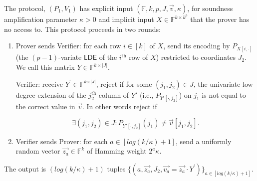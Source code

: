 \documentclass[11pt]{article}
\makeatletter
\newcommand{\LDE}{\mathsf{LDE}}
\newcommand{\F}{\mathbb{F}}
\newenvironment{protocol}[1][htb]{
    \renewcommand{\ALG@name}{Protocol}
    \begin{algorithm}[#1]
    }{\end{algorithm}
}
\makeatother
\begin{document}
\begin{protocol}
\caption{Polynomial Folding Protocol}
\label{TensRedAlg}
The protocol, $(P_{1}, V_{1})$ has explicit input $(\F,k,p,J,\Vec{v},\kappa)$, for soundness amplification parameter $\kappa>0$ and implicit input $X\in\F^{k\times k^{p}}$ that the prover has no access to. This protocol proceeds in two rounds:

\begin{enumerate}
    \item Prover sends Verifier: for each row $i \in [k]$ of $X$, send its encoding by $P_{X[i,\cdot]}$ (the $(p-1)$-variate $\LDE$ of the $i^{\text{th}}$ row of $X$) restricted to coordinates $J_{2}$. We call this matrix $Y\in\F^{k\times |J|}$.

    Verifier: receive $Y^\prime\in \F^{k\times \vert J\vert }$, reject if for some $(j_{1},j_{2})\in J$, the univariate low degree extension of the $j_{2}^{\text{th}}$ column of $Y'$ (i.e., $P_{Y'[\cdot,j_{2}]}$) on $j_{1}$ is not equal to the correct value in $\vec{v}$. In other words reject if 

    \begin{equation*}
        \exists (j_{1}, j_{2})\in J: P_{Y'[\cdot,j_{2}]}(j_{1})\neq \Vec{v}[j_{1}, j_{2}].
    \end{equation*}
    
    \item \label{VPrandvecpolyfold} Verifier sends Prover: for each $a \in [log(k/\kappa) + 1]$, send a uniformly random vector $\vec{z_{a}} \in \F^{k}$ of Hamming weight $2^{a}\kappa$.
\end{enumerate}
The output is $(log(k/\kappa) + 1)$ tuples $\{(a, \vec{z_{a}}, J_{2}, \vec{v_{a}}=\vec{z_{a}}\cdot  Y^\prime)\}_{a\in[log(k/\kappa)+1]}$.
\end{protocol}
\end{document}
